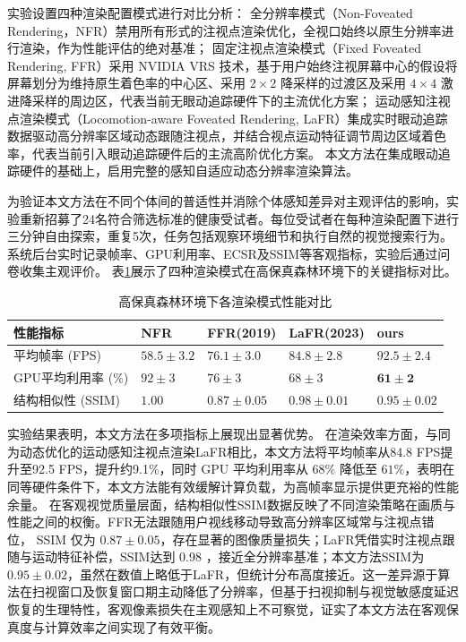 实验设置四种渲染配置模式进行对比分析：
全分辨率模式（Non-Foveated Rendering，NFR）禁用所有形式的注视点渲染优化，全视口始终以原生分辨率进行渲染，作为性能评估的绝对基准；
固定注视点渲染模式（Fixed Foveated Rendering, FFR）采用 NVIDIA VRS 技术，基于用户始终注视屏幕中心的假设将屏幕划分为维持原生着色率的中心区、采用 $2\times2$ 降采样的过渡区及采用 $4\times4$ 激进降采样的周边区，代表当前无眼动追踪硬件下的主流优化方案\cite{1-2-11-1}；
运动感知注视点渲染模式（Locomotion-aware Foveated Rendering, LaFR）集成实时眼动追踪数据驱动高分辨率区域动态跟随注视点，并结合视点运动特征调节周边区域着色率，代表当前引入眼动追踪硬件后的主流高阶优化方案\cite{1-2-14-1}。
本文方法在集成眼动追踪硬件的基础上，启用完整的感知自适应动态分辨率渲染算法。

为验证本文方法在不同个体间的普适性并消除个体感知差异对主观评估的影响，实验重新招募了24名符合筛选标准的健康受试者。每位受试者在每种渲染配置下进行三分钟自由探索，重复5次，任务包括观察环境细节和执行自然的视觉搜索行为。系统后台实时记录帧率、GPU利用率、ECSR及SSIM等客观指标，实验后通过问卷收集主观评价。
表\ref{tab:performance_comparison}展示了四种渲染模式在高保真森林环境下的关键指标对比。

\begin{table}[htbp]
\centering
\caption{高保真森林环境下各渲染模式性能对比}
\label{tab:performance_comparison}
\renewcommand{\arraystretch}{1.5}
\begin{tabularx}{\textwidth}{
>{\centering\arraybackslash}m{}
>{\centering\arraybackslash}m{}
>{\centering\arraybackslash}m{}
>{\centering\arraybackslash}m{}
>{\centering\arraybackslash}m{}}
\toprule
\textbf{性能指标} & \textbf{NFR} & \textbf{FFR(2019)} & \textbf{LaFR(2023)} & \textbf{ours} \\
\midrule
平均帧率 (FPS) & $58.5 \pm 3.2$ & $76.1 \pm 3.0$ & $84.8 \pm 2.8$ & $\mathbf{92.5 \pm 2.4}$ \\
GPU平均利用率 (\%) & $92 \pm 3$ & $76 \pm 3$ & $68 \pm 3$ & $\mathbf{61 \pm 2}$ \\
结构相似性 (SSIM) & $\mathbf{1.00}$ & $0.87 \pm 0.05$ & $0.98 \pm 0.01$ & $0.95 \pm 0.02$ \\
\bottomrule
\end{tabularx}
\end{table}


实验结果表明，本文方法在多项指标上展现出显著优势。
在渲染效率方面，与同为动态优化的运动感知注视点渲染LaFR相比，本文方法将平均帧率从84.8 FPS提升至92.5 FPS，提升约9.1\%，同时 GPU 平均利用率从 $68\%$ 降低至 $61\%$，表明在同等硬件条件下，本文方法能有效缓解计算负载，为高帧率显示提供更充裕的性能余量。
在客观视觉质量层面，结构相似性SSIM数据反映了不同渲染策略在画质与性能之间的权衡。FFR无法跟随用户视线移动导致高分辨率区域常与注视点错位， SSIM 仅为 $0.87 \pm 0.05$，存在显著的图像质量损失；LaFR凭借实时注视点跟随与运动特征补偿，SSIM达到 0.98 ，接近全分辨率基准；本文方法SSIM为 $0.95 \pm 0.02$，虽然在数值上略低于LaFR，但统计分布高度接近。这一差异源于算法在扫视窗口及恢复窗口期主动降低了分辨率，但基于扫视抑制与视觉敏感度延迟恢复的生理特性，客观像素损失在主观感知上不可察觉，证实了本文方法在客观保真度与计算效率之间实现了有效平衡。

